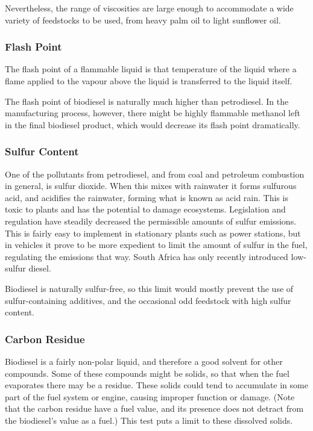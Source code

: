 Nevertheless, the range of viscosities are large enough to accommodate a wide variety of feedstocks to be used, from heavy palm oil to light sunflower oil.

\subsubsection{Flash Point}

The flash point of a flammable liquid is that temperature of the liquid where a flame applied to the vapour above the liquid is transferred to the liquid itself.

The flash point of biodiesel is naturally much higher than petrodiesel. In the manufacturing process, however, there might be highly flammable methanol left in the final biodiesel product, which would decrease its flash point dramatically. 

\subsubsection{Sulfur Content}

One of the pollutants from petrodiesel, and from coal and petroleum combustion in general, is sulfur dioxide. When this mixes with rainwater it forms sulfurous acid, and acidifies the rainwater, forming what is known as acid rain. This is toxic to plants and has the potential to damage ecosystems. Legislation and regulation have steadily decreased the permissible amounts of sulfur emissions. This is fairly easy to implement in stationary plants such as power stations, but in vehicles it prove to be more expedient to limit the amount of sulfur in the fuel, regulating the emissions that way. South Africa has only recently introduced low-sulfur diesel.

Biodiesel is naturally sulfur-free, so this limit would mostly prevent the use of sulfur-containing additives, and the occasional odd feedstock with high sulfur content.

\subsubsection{Carbon Residue}

Biodiesel is a fairly non-polar liquid, and therefore a good solvent for other compounds. Some of these compounds might be solids, so that when the fuel evaporates there may be a residue. These solids could tend to accumulate in some part of the fuel system or engine, causing improper function or damage. (Note that the carbon residue have a fuel value, and its presence does not detract from the biodiesel's value as a fuel.) This test puts a limit to these dissolved solids. 

